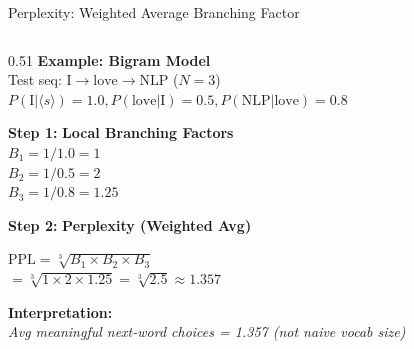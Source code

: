 \documentclass[aspectratio=169,xcolor=dvipsnames,svgnames,x11names,fleqn]{beamer}
\begin{document}
\begin{frame}[fragile]{Perplexity: Weighted Average Branching Factor}
\begin{columns}[T]
        \begin{column}{0.51\textwidth}
            \scriptsize
            \textcolor{branchGold}{\textbf{Example: Bigram Model}} \\
            Test seq: $\text{I} \rightarrow \text{love} \rightarrow \text{NLP}$ ($N=3$) \\
            $P(\text{I}|\langle s \rangle)=1.0, P(\text{love}|\text{I})=0.5, P(\text{NLP}|\text{love})=0.8$

            \vspace{8pt}
            \textbf{\textcolor{branchGold}{Step 1:}} \textbf{Local Branching Factors} \\
            $B_1 = 1/1.0 = 1$ \\
            $B_2 = 1/0.5 = 2$ \\
            $B_3 = 1/0.8 = 1.25$

            \vspace{8pt}
            \textbf{\textcolor{branchGold}{Step 2:}} \textbf{Perplexity (Weighted Avg)} \\
            \begin{tcolorbox}[colback=white, colframe=branchGold!40, arc=1mm]
                \centering
                $\text{PPL} = \sqrt[3]{B_1 \times B_2 \times B_3}$ \\
                $= \sqrt[3]{1 \times 2 \times 1.25} = \sqrt[3]{2.5} \approx \mathbf{1.357}$
            \end{tcolorbox}

            \vspace{5pt}
            \textbf{Interpretation:} \\
            \textit{Avg meaningful next-word choices = 1.357 (not naive vocab size)}
        \end{column}
    \end{columns}
\end{frame}
\end{document}
